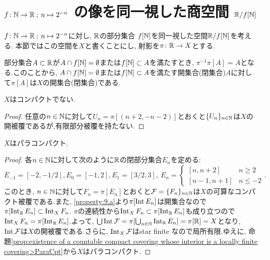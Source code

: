 \documentclass[uplatex, dvipdfmx, a4paper, 12pt, class=jsbook, crop=false]{standalone}
\begin{document}
\section{\texorpdfstring{$f \colon \mathbb{N} \to \mathbb{R} \mathpunct{\: ; \:} n \mapsto 2^{-n}$}{f:N→R;n↦2\^{}(-n)} の像を同一視した商空間 \texorpdfstring{$ \mathbb{R} / f[\mathbb{N}] $}{R/f[N]}}
\label{ex:quotient-of-R-2}

$f \colon \mathbb{N} \to \mathbb{R} \mathpunct{\: ; \:} n \mapsto 2^{-n}$に対し, $ \mathbb{R} $の部分集合
$ f[\mathbb{N}] $を同一視した空間$ \mathbb{R} / f[\mathbb{N}] $を考える. 本節ではこの空間を$ X $と書くことにし, 射影を$ \pi \colon \mathbb{R} \to X$とする.

\begin{property}
	\label{property:9.a}
	部分集合$A\subset \mathbb{R}$が$A\cap f[\mathbb{N}] = \emptyset$または$f[\mathbb{N}] \subset A$を満たすとき, $\pi^{-1}\pi[A]=A$となる.このことから, 
	$A\cap f[\mathbb{N}] = \emptyset$または$f[\mathbb{N}] \subset A$を満たす開集合(閉集合)$ A $に対して$ \pi[A] $は$ X $の開集合(閉集合)である.
\end{property}

\begin{property}
	$ X $はコンパクトでない.
\end{property}

\begin{proof}
	任意の$ n \in \mathbb{N} $に対して$ U_n = \pi[(n+2, -n-2)] $とおくと$\{U_n\}_{n \in \mathbb{N}}$は$ X $の開被覆であるが,有限部分被覆を持たない.
\end{proof}

\begin{property}
	$ X $はパラコンパクト.
\end{property}

\begin{proof}
	各$n \in \mathbb{N}$に対して次のように$ \mathbb{R} $の閉部分集合$ E_n $を定める:
	$$ E_{-1} = [-2, -1 / 2], E_{0} = [-1, 2], E_1 = [3 / 2, 3],\ E_n = \begin{cases}
	[n, n+2] & n\geq 2\\
	[n-1, n+1] & n\leq -2
	\end{cases}.$$
	このとき, $n \in \mathbb{N}$に対して$ F_n = \pi[E_n] $とおくと$\mathcal{F} = \{F_n\}_{n\in\mathbb{N}}$は$X$の可算なコンパクト被覆である.また, \ref{property:9.a}より$\pi[\mathop{\mathrm{Int}}\nolimits{E_n}]$は開集合なので$ \pi[\mathop{\mathrm{Int}}\nolimits_{\mathbb{R}}{E_n}] \subset \mathop{\mathrm{Int}}\nolimits_X F_n$. $ \pi $の連続性から$ \mathop{\mathrm{Int}}\nolimits_{X} F_n \subset \pi[\mathop{\mathrm{Int}}\nolimits_{\mathbb{R}} E_n]$も成り立つので$\mathop{\mathrm{Int}}\nolimits_{X} F_n = \pi[\mathop{\mathrm{Int}}\nolimits_{\mathbb{R}} E_n]$.よって, $\bigcup \mathop{\mathrm{Int}}\nolimits \mathcal{F} = \pi[\bigcup_{n\in \mathbb{N}} \mathop{\mathrm{Int}}\nolimits_{\mathbb{R}} E_n] = \pi[\mathbb{R}] = X$となり, $\mathop{\mathrm{Int}}\nolimits \mathcal{F}$は$X$の開被覆である.さらに, $\mathop{\mathrm{Int}}\nolimits_{X} \mathcal{F}$はstar finite なので局所有限.ゆえに, 命題\ref{prop:existence of a countable compact covering whose interior is a locally finite covering>ParaCpt}から$ X $はパラコンパクト. 
\end{proof}
\end{document}
